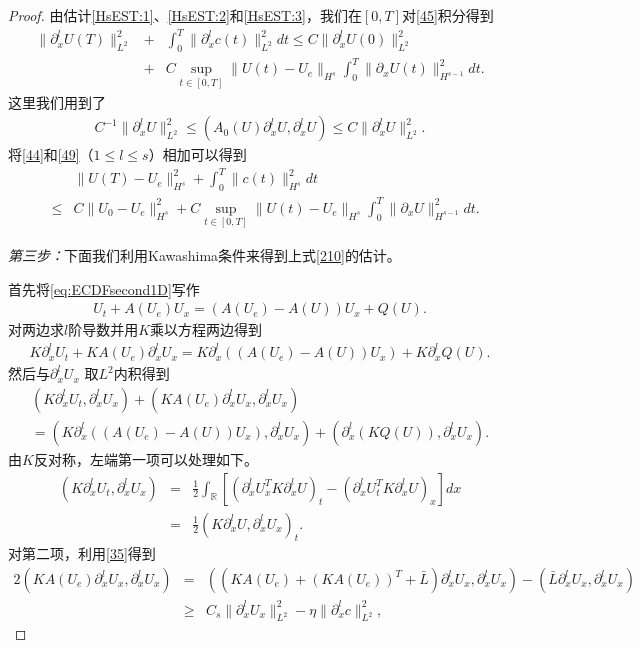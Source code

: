 \begin{proof}
由估计\eqref{HsEST:1}、\eqref{HsEST:2}和\eqref{HsEST:3}，我们在$[0,T]$对\eqref{45}积分得到
\begin{eqnarray}\label{49}
  \|\partial^l_x U(T)\|_{L^2}^2&  + & \int_0^T \|\partial^l_x c(t)\|^2_{L^2}dt \le C\|\partial^l_x U(0)\|_{L^2}^2  \nonumber\\[3mm]
 & +& C\sup_{t \in [0,T]}\|U(t)-U_e\|_{H^s} \int_0^T \|\partial_x U(t)\|^2_{H^{s-1}}dt .
\end{eqnarray}
这里我们用到了
\begin{eqnarray*}
   C^{-1} \|\partial^l_x U\|_{L^2}^2 \le  (A_0(U) \partial^l_x U,\partial^l_x U) \le C \|\partial^l_x U\|_{L^2}^2.
\end{eqnarray*}
将\eqref{44}和\eqref{49}（$1 \le l \le s$）相加可以得到
  \begin{eqnarray}\label{210}
    && \|U(T)-U_e\|^2_{H^{s}}  +  \int_0^T \|c(t)\|^2_{H^s} dt \nonumber \\
    & \le & C \|U_0-U_e\|_{H^{s}}^2 + C \sup_{t \in [0,T]} \|U(t) - U_e\|_{H^s} \int_0^T \|\partial_x U\|_{H^{s-1}}^2dt.
\end{eqnarray}

\emph{第三步：}下面我们利用Kawashima条件来得到上式\eqref{210}的估计。

首先将\eqref{eq:ECDFsecond1D}写作
\begin{eqnarray*}
  U_t + A(U_e) U_x  = (A(U_e) -A(U))U_x + Q(U).
\end{eqnarray*}
对两边求$l$阶导数并用$K$乘以方程两边得到
\begin{eqnarray*}
  K \partial^l_x U_t + K A(U_e) \partial^l_x U_x  = K \partial^l_x ((A(U_e)-A(U))U_x) + K\partial^l_x Q(U).
\end{eqnarray*}
然后与$\partial^l_x U_x$ 取$L^2$内积得到
\begin{eqnarray}\label{211}
  (K \partial^l_x U_t, \partial^l_x U_x) + (KA(U_e) \partial^l_x U_x, \partial^l_x U_x) \nonumber \\ = (K \partial^l_x((A(U_e)-A(U))U_x),\partial^l_x U_x) + (\partial^l_x( K Q(U) ),\partial^l_x U_x).
\end{eqnarray}
由$K$反对称，左端第一项可以处理如下。
\begin{eqnarray}\label{212}
  (K\partial^l_x U_t, \partial^l_x U_x) &=& \frac{1}{2} \int_\mathbb{R} \left[(\partial^l_x U^T_x K \partial^l_x U )_t -  (\partial^l_x U_t^T K\partial^l_x U  )_x \right]dx  \nonumber \\
  &=& \frac{1}{2}(K \partial^l_x U,\partial^l_x U_x)_t .
\end{eqnarray}
对第二项，利用\eqref{35}得到
\begin{eqnarray}\label{213}
  2(KA(U_e) \partial^l_x U_x,\partial^l_x U_x) &=& ( (KA(U_e)+ (K A(U_e))^T +\bar{L}) \partial^l_x U_x, \partial^l_x U_x) - (\bar{L}\partial^l_x U_x, \partial^l_x U_x) \nonumber\\
  &\ge& C_s \|\partial^l_x U_x \|^2_{L^2} -\eta \|\partial^l_x c\|^2_{L^2},
\end{eqnarray}


\end{proof}
